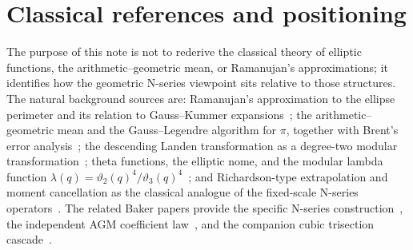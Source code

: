 \documentclass[11pt]{article}
\begin{document}
\section{Classical references and positioning}

The purpose of this note is not to rederive the classical theory of elliptic
functions, the arithmetic--geometric mean, or Ramanujan's approximations; it
identifies how the geometric N-series viewpoint sits relative to those
structures. The natural background sources are: Ramanujan's approximation to the
ellipse perimeter and its relation to Gauss--Kummer
expansions~\cite{berndt1991}; the arithmetic--geometric mean and the
Gauss--Legendre algorithm for $\pi$, together with Brent's error
analysis~\cite{borwein1987,brent1976}; the descending Landen transformation as a
degree-two modular transformation~\cite{lawden1989}; theta functions, the
elliptic nome, and the modular lambda function
$\lambda(q)=\vartheta_2(q)^4/\vartheta_3(q)^4$~\cite{whittaker1927,abramowitz1972};
and Richardson-type extrapolation and moment cancellation as the classical
analogue of the fixed-scale N-series
operators~\cite{richardson1911,trefethen2014}. The related Baker papers provide
the specific N-series construction~\cite{BakerNSeries2026}, the independent AGM
coefficient law~\cite{BakerAGM2026}, and the companion cubic trisection
cascade~\cite{BakerCascade2026}.
\end{document}
